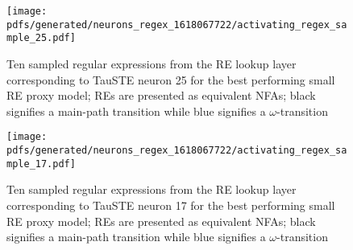\begin{figure}[t!]
  \centering
  \texttt{[image: pdfs/generated/neurons\_regex\_1618067722/activating\_regex\_sample\_25.pdf]}
  \caption[Ten sampled regular expressions from the RE lookup layer
  corresponding to TauSTE neuron 25 for the best performing small RE proxy
  model]{Ten sampled regular expressions from the RE lookup layer
    corresponding to TauSTE neuron 25 for the best performing small RE proxy
    model; REs are presented as equivalent NFAs; black signifies a
    main-path transition while blue signifies a $\omega$-transition}
  \label{fig:regex_example_neuron_reminder}
\end{figure}

\begin{figure}[t!]
  \centering
  \texttt{[image: pdfs/generated/neurons\_regex\_1618067722/activating\_regex\_sample\_17.pdf]}
  \caption[Ten sampled regular expressions from the RE lookup layer
  corresponding to TauSTE neuron 17 for the best performing small RE proxy
  model]{Ten sampled regular expressions from the RE lookup layer
    corresponding to TauSTE neuron 17 for the best performing small RE proxy
    model; REs are presented as equivalent NFAs; black signifies a
    main-path transition while blue signifies a $\omega$-transition}
  \label{fig:regex_example_neuron_weather}
\end{figure}

\clearpage

